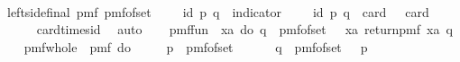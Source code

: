 \begin{isabellebody}
\ \ \isamarkupfalse%
\ \isamarkupfalse%
\ left{\isacharunderscore}{\kern0pt}side{\isacharunderscore}{\kern0pt}final{\isacharcolon}{\kern0pt}\ {\isachardoublequoteopen}pmf\ {\isacharparenleft}{\kern0pt}pmf{\isacharunderscore}{\kern0pt}of{\isacharunderscore}{\kern0pt}set\ {\isacharparenleft}{\kern0pt}{\isasymK}\ {\isasymtimes}\ {\isasymK}\ {\isacharminus}{\kern0pt}\ {\isacharquery}{\kern0pt}id{\isacharparenright}{\kern0pt}{\isacharparenright}{\kern0pt}\ {\isacharparenleft}{\kern0pt}p{\isacharcomma}{\kern0pt}\ q{\isacharparenright}{\kern0pt}\ {\isacharequal}{\kern0pt}\ indicator\ {\isacharparenleft}{\kern0pt}{\isasymK}\ {\isasymtimes}\ {\isasymK}\ {\isacharminus}{\kern0pt}\ {\isacharquery}{\kern0pt}id{\isacharparenright}{\kern0pt}\ {\isacharparenleft}{\kern0pt}p{\isacharcomma}{\kern0pt}\ q{\isacharparenright}{\kern0pt}\ {\isacharslash}{\kern0pt}\ {\isacharparenleft}{\kern0pt}card\ {\isasymK}\ {\isacharasterisk}{\kern0pt}\ {\isacharparenleft}{\kern0pt}card\ {\isasymK}\ {\isacharminus}{\kern0pt}\ {}{\isacharparenright}{\kern0pt}{\isacharparenright}{\kern0pt}{\isachardoublequoteclose}\isanewline
\ \ \ \ \isamarkupfalse%
\ card{\isacharunderscore}{\kern0pt}times{\isacharunderscore}{\kern0pt}id\ \isamarkupfalse%
\ auto\isanewline
\isanewline
\isanewline
\ \ \isamarkupfalse%
\ {\isacharquery}{\kern0pt}pmf{\isacharunderscore}{\kern0pt}fun\ {\isacharequal}{\kern0pt}\ {\isachardoublequoteopen}{\isasymlambda}xa{\isachardot}{\kern0pt}\ do\ {\isacharbraceleft}{\kern0pt}q\ {\isasymleftarrow}\ pmf{\isacharunderscore}{\kern0pt}of{\isacharunderscore}{\kern0pt}set\ {\isacharparenleft}{\kern0pt}{\isasymK}\ {\isacharminus}{\kern0pt}\ {\isacharbraceleft}{\kern0pt}xa{\isacharbraceright}{\kern0pt}{\isacharparenright}{\kern0pt}{\isacharsemicolon}{\kern0pt}\ return{\isacharunderscore}{\kern0pt}pmf\ {\isacharparenleft}{\kern0pt}xa{\isacharcomma}{\kern0pt}\ q{\isacharparenright}{\kern0pt}{\isacharbraceright}{\kern0pt}{\isachardoublequoteclose}\isanewline
\ \ \isamarkupfalse%
\ {\isacharquery}{\kern0pt}pmf{\isacharunderscore}{\kern0pt}whole\ {\isacharequal}{\kern0pt}\ {\isachardoublequoteopen}pmf\ {\isacharparenleft}{\kern0pt}do\ {\isacharbraceleft}{\kern0pt}\isanewline
\ \ \ \ p\ {\isasymleftarrow}\ pmf{\isacharunderscore}{\kern0pt}of{\isacharunderscore}{\kern0pt}set\ {\isasymK}{\isacharsemicolon}{\kern0pt}\ \isanewline
\ \ \ \ q\ {\isasymleftarrow}\ pmf{\isacharunderscore}{\kern0pt}of{\isacharunderscore}{\kern0pt}set\ {\isacharparenleft}{\kern0pt}{\isasymK}\ {\isacharminus}{\kern0pt}\ {\isacharbraceleft}{\kern0pt}p{\isacharbraceright}{\kern0pt}{\isacharparenright}{\kern0pt}{\isacharsemicolon}{\kern0pt}\isanewline

\end{isabellebody}
